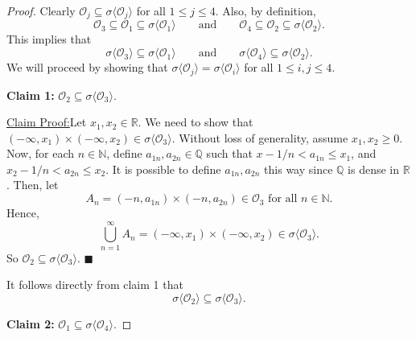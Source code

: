 \documentclass[12pt]{article}
\newenvironment{claimproof}[1]{\par\noindent\underline{Claim Proof:}\space#1}{\hfill $\blacksquare$}
\begin{document}
\begin{proof}
Clearly $\mathcal{O}_{j} \subseteq \sigma \langle \mathcal{O}_{j}\rangle$ for all $1 \leq j \leq 4$. Also, by definition,
\[ \mathcal{O}_{3} \subseteq \mathcal{O}_{1} \subseteq \sigma\langle \mathcal{O}_{1}\rangle \qquad \text{and} \qquad \mathcal{O}_{4} \subseteq
\mathcal{O}_{2} \subseteq \sigma\langle \mathcal{O}_{2}\rangle. \]
This implies that 
\begin{equation}
\sigma\langle\mathcal{O}_{3}\rangle \subseteq \sigma\langle\mathcal{O}_{1}\rangle \qquad \text{and} \qquad \sigma\langle\mathcal{O}_{4}\rangle
\subseteq \sigma\langle \mathcal{O}_{2}\rangle. 
\label{eqn:10.1}
\end{equation}
We will proceed by showing that $\sigma\langle\mathcal{O}_{j}\rangle = \sigma\langle\mathcal{O}_{i}\rangle$ for all $1 \leq i,j\leq 4$.

{\bf Claim 1:} $\mathcal{O}_{2} \subseteq \sigma\langle\mathcal{O}_{3}\rangle$.

\begin{claimproof}
Let $x_{1}, x_{2} \in \mathbb{R}$. We need to show that $(-\infty, x_{1}) \times (-\infty, x_{2}) \in \sigma\langle\mathcal{O}_{3}\rangle$. Without
loss of generality, assume $x_{1}, x_{2} \geq 0$. Now, for each $n \in \mathbb{N}$, define $a_{1n}, a_{2n} \in \mathbb{Q}$ such that $x - 1/n < a_{1n}
\leq x_{1}$, and $x_{2} - 1/n < a_{2n} \leq x_{2}$. It is possible to define $a_{1n}, a_{2n}$ this way since $\mathbb{Q}$ is dense in $\mathbb{R}$.
Then, let
\[ A_{n} = (-n, a_{1n}) \times (-n, a_{2n}) \in \mathcal{O}_{3} \text{ for all } n \in \mathbb{N}. \]
Hence,
\[ \bigcup_{n=1}^{\infty}A_{n} = (-\infty, x_{1}) \times (-\infty, x_{2}) \in \sigma\langle \mathcal{O}_{3}\rangle. \]
So $\mathcal{O}_{2} \subseteq \sigma\langle\mathcal{O}_{3}\rangle$.
\end{claimproof}

It follows directly from claim 1 that 
\begin{equation}
\sigma\langle\mathcal{O}_{2}\rangle \subseteq \sigma\langle\mathcal{O}_{3}\rangle.
\label{eqn:10.2}
\end{equation}

{\bf Claim 2:} $\mathcal{O}_{1} \subseteq \sigma\langle\mathcal{O}_{4}\rangle$.


\end{proof}
\end{document}
